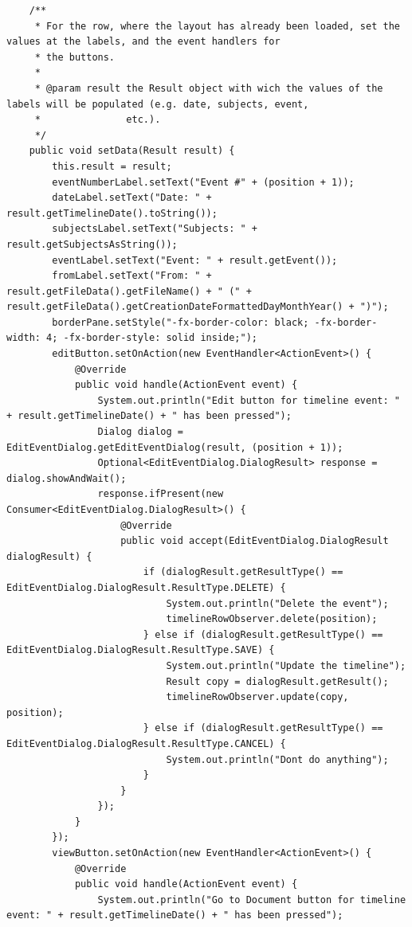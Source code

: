 \begin{lstlisting}
    /**
     * For the row, where the layout has already been loaded, set the values at the labels, and the event handlers for
     * the buttons.
     *
     * @param result the Result object with wich the values of the labels will be populated (e.g. date, subjects, event,
     *               etc.).
     */
    public void setData(Result result) {
        this.result = result;
        eventNumberLabel.setText("Event #" + (position + 1));
        dateLabel.setText("Date: " + result.getTimelineDate().toString());
        subjectsLabel.setText("Subjects: " + result.getSubjectsAsString());
        eventLabel.setText("Event: " + result.getEvent());
        fromLabel.setText("From: " + result.getFileData().getFileName() + " (" + result.getFileData().getCreationDateFormattedDayMonthYear() + ")");
        borderPane.setStyle("-fx-border-color: black; -fx-border-width: 4; -fx-border-style: solid inside;");
        editButton.setOnAction(new EventHandler<ActionEvent>() {
            @Override
            public void handle(ActionEvent event) {
                System.out.println("Edit button for timeline event: " + result.getTimelineDate() + " has been pressed");
                Dialog dialog = EditEventDialog.getEditEventDialog(result, (position + 1));
                Optional<EditEventDialog.DialogResult> response = dialog.showAndWait();
                response.ifPresent(new Consumer<EditEventDialog.DialogResult>() {
                    @Override
                    public void accept(EditEventDialog.DialogResult dialogResult) {
                        if (dialogResult.getResultType() == EditEventDialog.DialogResult.ResultType.DELETE) {
                            System.out.println("Delete the event");
                            timelineRowObserver.delete(position);
                        } else if (dialogResult.getResultType() == EditEventDialog.DialogResult.ResultType.SAVE) {
                            System.out.println("Update the timeline");
                            Result copy = dialogResult.getResult();
                            timelineRowObserver.update(copy, position);
                        } else if (dialogResult.getResultType() == EditEventDialog.DialogResult.ResultType.CANCEL) {
                            System.out.println("Dont do anything");
                        }
                    }
                });
            }
        });
        viewButton.setOnAction(new EventHandler<ActionEvent>() {
            @Override
            public void handle(ActionEvent event) {
                System.out.println("Go to Document button for timeline event: " + result.getTimelineDate() + " has been pressed");

\end{lstlisting}
